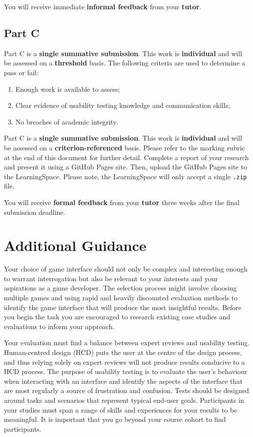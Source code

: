 \documentclass{../../../fal_assignment}
\begin{document}
You will receive immediate \textbf{informal feedback} from your \textbf{tutor}.

\subsection*{Part C}

Part C is a \textbf{single summative submission}. This work is \textbf{individual} and will be assessed on a \textbf{threshold} basis. The following criteria are used to determine a pass or fail: 

\begin{enumerate}[label=(\alph*)]
	\item Enough work is available to assess; 
	\item Clear evidence of usability testing knowledge and communication skills; 
	\item No breaches of academic integrity. 
\end{enumerate}

Part C is a \textbf{single summative submission}. This work is \textbf{individual} and will be assessed on a \textbf{criterion-referenced} basis. Please refer to the marking rubric at the end of this document for further detail. Complete a report of your research and present it using a GitHub Pages site. Then, upload the GitHub Pages site to the LearningSpace. Please note, the LearningSpace will only accept a single \texttt{.zip} file. 

You will receive \textbf{formal feedback} from your \textbf{tutor} three weeks after the final submission deadline.

\section*{Additional Guidance}

Your choice of game interface should not only be complex and interesting enough to warrant interrogation but also be relevant to your interests and your aspirations as a game developer. The selection process might involve choosing multiple games and using rapid and heavily discounted evaluation methods to identify the game interface that will produce the most insightful results. Before you begin the task you are encouraged to research existing case studies and evaluations to inform your approach. 

Your evaluation must find a balance between expert reviews and usability testing. Human-centred design (HCD) puts the user at the centre of the design process, and thus relying solely on expert reviews will not produce results conducive to a HCD process. The purpose of usability testing is to evaluate the user's behaviour when interacting with an interface and identify the aspects of the interface that are most regularly a source of frustration and confusion. Tests should be designed around tasks and scenarios that represent typical end-user goals. Participants in your studies must span a range of skills and experiences for your results to be meaningful. It is important that you go beyond your course cohort to find participants. 
\end{document}
